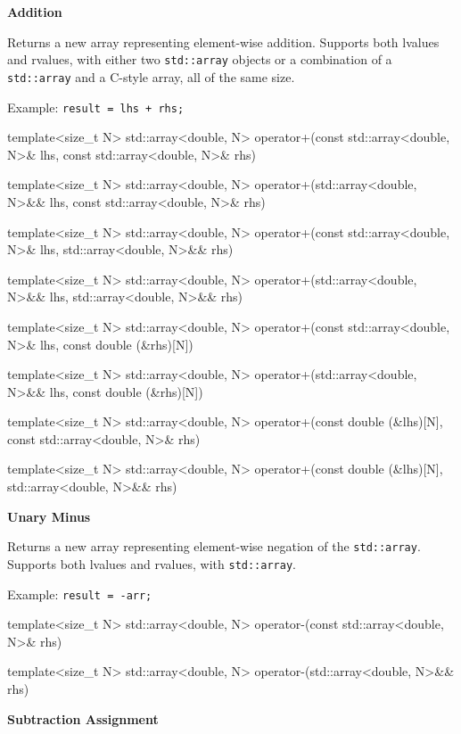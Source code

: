 \documentclass[11pt,fleqn]{report}
\begin{document}
\textbf{Addition}

Returns a new array representing element-wise addition.  
Supports both lvalues and rvalues, with either two \texttt{std::array} objects or
a combination of a \texttt{std::array} and a C-style array, all of the same size.

Example: \texttt{result = lhs + rhs;}
\begin{code}
template<size_t N>
std::array<double, N> operator+(const std::array<double, N>& lhs, 
                                const std::array<double, N>& rhs)

template<size_t N>
std::array<double, N> operator+(std::array<double, N>&& lhs, 
                                const std::array<double, N>& rhs)

template<size_t N>
std::array<double, N> operator+(const std::array<double, N>& lhs, 
                                std::array<double, N>&& rhs)

template<size_t N>
std::array<double, N> operator+(std::array<double, N>&& lhs, 
                                std::array<double, N>&& rhs)

template<size_t N>
std::array<double, N> operator+(const std::array<double, N>& lhs, 
                                const double (&rhs)[N])

template<size_t N>
std::array<double, N> operator+(std::array<double, N>&& lhs, 
                                const double (&rhs)[N])

template<size_t N>
std::array<double, N> operator+(const double (&lhs)[N], 
                                const std::array<double, N>& rhs)

template<size_t N>
std::array<double, N> operator+(const double (&lhs)[N], 
                                std::array<double, N>&& rhs)
\end{code}

\textbf{Unary Minus}  

Returns a new array representing element-wise negation of the \texttt{std::array}.  
Supports both lvalues and rvalues, with \texttt{std::array}.

Example: \texttt{result = -arr;}  
\begin{code}
template<size_t N>
std::array<double, N> operator-(const std::array<double, N>& rhs)

template<size_t N>
std::array<double, N> operator-(std::array<double, N>&& rhs)
\end{code}

\textbf{Subtraction Assignment}  
\end{document}
